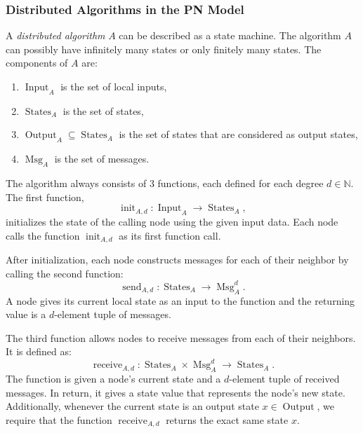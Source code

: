 \subsubsection{Distributed Algorithms in the PN Model}

\newcommand{\algin}{\operatorname{Input}}
\newcommand{\algstates}{\operatorname{States}}
\newcommand{\algout}{\operatorname{Output}}
\newcommand{\algmsg}{\operatorname{Msg}}

\newcommand{\alginit}{\operatorname{init}}
\newcommand{\algsend}{\operatorname{send}}
\newcommand{\algrecv}{\operatorname{receive}}

A \emph{distributed algorithm} $A$ can be described as a state machine.
The algorithm $A$ can possibly have infinitely many states or only finitely many states.
The components of $A$ are:
\begin{enumerate}
  \item $\algin_A$ is the set of local inputs,
  \item $\algstates_A$ is the set of states,
  \item $\algout_A \subseteq \algstates_A$ is the set of states that are considered as output states,
  \item $\algmsg_A$ is the set of messages.
\end{enumerate}

The algorithm always consists of 3 functions, each defined for each degree $d \in \mathbb{N}$.
The first function, \[ \alginit_{A,d}\colon \algin_A \rightarrow \algstates_A, \] initializes the state of the calling node using the given input data.
Each node calls the function $\alginit_{A,d}$ as its first function call.

After initialization, each node constructs messages for each of their neighbor by calling the second function:
\[ \algsend_{A,d}\colon \algstates_A \rightarrow \algmsg_A^d. \]
A node gives its current local state as an input to the function and the returning value is a $d$-element tuple of messages.

The third function allows nodes to receive messages from each of their neighbors.
It is defined as:
\[ \algrecv_{A,d}\colon \algstates_A \times \algmsg_A^d \rightarrow \algstates_A. \]
The function is given a node's current state and a $d$-element tuple of received messages.
In return, it gives a state value that represents the node's new state.
Additionally, whenever the current state is an output state $x \in \algout$, we require that the function $\algrecv_{A,d}$ returns the exact same state $x$.

